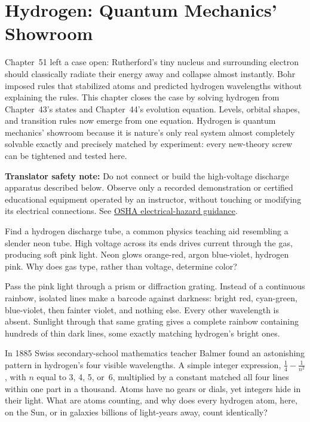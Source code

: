 \chapter{Hydrogen: Quantum Mechanics' Showroom}

Chapter~51 left a case open: Rutherford's tiny nucleus and surrounding electron should classically radiate their energy away and collapse almost instantly. Bohr imposed rules that stabilized atoms and predicted hydrogen wavelengths without explaining the rules. This chapter closes the case by solving hydrogen from Chapter~43's states and Chapter~44's evolution equation. Levels, orbital shapes, and transition rules now emerge from one equation. Hydrogen is quantum mechanics' showroom because it is nature's only real system almost completely solvable exactly and precisely matched by experiment: every new-theory screw can be tightened and tested here.


\textbf{Translator safety note:} Do not connect or build the high-voltage discharge apparatus described below. Observe only a recorded demonstration or certified educational equipment operated by an instructor, without touching or modifying its electrical connections. See \href{https://www.osha.gov/etools/poultry-processing/plant-wide-hazards/electrical-hazards}{OSHA electrical-hazard guidance}.

Find a hydrogen discharge tube, a common physics teaching aid resembling a slender neon tube. High voltage across its ends drives current through the gas, producing soft pink light. Neon glows orange-red, argon blue-violet, hydrogen pink. Why does gas type, rather than voltage, determine color?

Pass the pink light through a prism or diffraction grating. Instead of a continuous rainbow, isolated lines make a barcode against darkness: bright red, cyan-green, blue-violet, then fainter violet, and nothing else. Every other wavelength is absent. Sunlight through that same grating gives a complete rainbow containing hundreds of thin dark lines, some exactly matching hydrogen's bright ones.

In 1885 Swiss secondary-school mathematics teacher Balmer found an astonishing pattern in hydrogen's four visible wavelengths. A simple integer expression, \(\frac{1}{4}-\frac{1}{n^2}\), with \(n\) equal to 3, 4, 5, or~6, multiplied by a constant matched all four lines within one part in a thousand. Atoms have no gears or dials, yet integers hide in their light. What are atoms counting, and why does every hydrogen atom, here, on the Sun, or in galaxies billions of light-years away, count identically?

